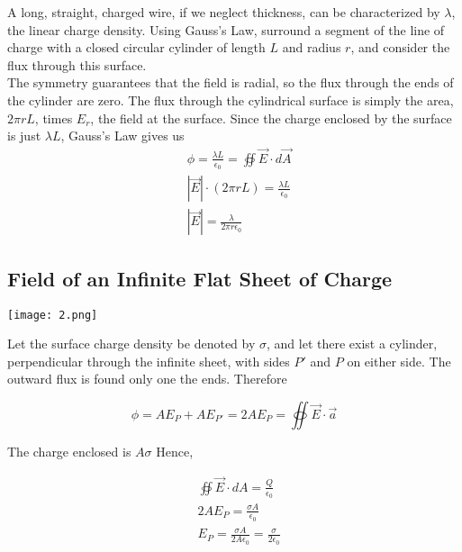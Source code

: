 \documentclass[svgnames]{article}
\begin{document}
\vspace{10px}


A long, straight, charged wire, if we neglect thickness, can be characterized
by $\lambda$, the linear charge density. Using Gauss's Law, surround a segment
of the line of charge with a closed circular cylinder of length $L$ and radius
$r$, and consider the flux through this surface. \\

The symmetry guarantees that the field is radial, so the flux through the ends
of the cylinder are zero. The flux through the cylindrical surface is simply
the area, $2\pi rL$, times $E_r$, the field at the surface. Since the charge
enclosed by the surface is just $\lambda L$, Gauss's Law gives us \\

\begin{align*}
 & \phi = \frac{\lambda L}{\epsilon_0} = \oiint \vec{E} \cdot d\vec{A} \\
 & |\vec{E}| \cdot (2 \pi r L) = \frac{\lambda L}{\epsilon_0} \\
 & |\vec{E}| = \frac{\lambda}{2\pi r \epsilon_0}
\end{align*}  

\subsection{Field of an Infinite Flat Sheet of Charge}

\vspace{20px}
\begin{center}
\texttt{[image: 2.png]}
\end{center} 
\vspace{20px}

Let the surface charge density be denoted by $\sigma$, and let there exist
a cylinder, perpendicular through the infinite sheet, with sides $P'$ and $P$
on either side. The outward flux is found only one the ends. Therefore

\[\phi =  AE_P + AE_{P'} = 2AE_P =\oiint \vec{E} \cdot \vec{a} \] 

The charge enclosed is $A\sigma$ Hence, 

\begin{align*}
&\oiint \vec{E} \cdot dA = \frac{Q}{\epsilon_0} \\ 
&2AE_P = \frac{\sigma A}{\epsilon_0} \\
&E_P = \frac{\sigma A}{2A \epsilon_0} = \frac{\sigma}{2 \epsilon_0}
\end{align*} \\
\end{document}
